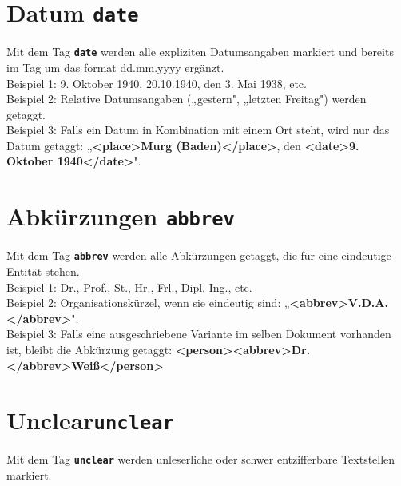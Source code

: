 \documentclass{article}
\begin{document}
\section*{Datum \texttt{\texttt{\textbf{{\colorbox{date}{date}}}}}}


Mit dem Tag \texttt{\texttt{\texttt{\textbf{{\colorbox{date}{date}}}}}} werden alle expliziten Datumsangaben markiert und bereits im Tag um das format dd.mm.yyyy ergänzt.\\

\noindent{} Beispiel 1: 9. Oktober 1940, 20.10.1940, den 3. Mai 1938, etc.\\
 Beispiel 2: Relative Datumsangaben („gestern", „letzten Freitag") werden getaggt.\\
 Beispiel 3: Falls ein Datum in Kombination mit einem Ort steht, wird nur das Datum getaggt: „\textbf{\textless place\textgreater Murg (Baden)\textless /place\textgreater }, den \textbf{\textless date\textgreater 9. Oktober 1940\textless /date\textgreater }". \\

\section*{Abkürzungen \texttt{\textbf{{\colorbox{abbrev}{abbrev}}}}}


Mit dem Tag \texttt{\texttt{\textbf{{\colorbox{abbrev}{abbrev}}}}} werden alle Abkürzungen getaggt, die für eine eindeutige Entität stehen. \\

\noindent{} Beispiel 1: Dr., Prof., St., Hr., Frl., Dipl.-Ing., etc.\\
 Beispiel 2: Organisationskürzel, wenn sie eindeutig sind: „\textbf{\textless abbrev\textgreater V.D.A.\textless /abbrev\textgreater }".\\
 Beispiel 3: Falls eine ausgeschriebene Variante im selben Dokument vorhanden ist, bleibt die Abkürzung getaggt: \textbf{\textless person\textgreater \textless abbrev\textgreater Dr.\textless /abbrev\textgreater Weiß\textless /person\textgreater}


\section*{Unclear\texttt{\textbf{{\colorbox{unclear}{unclear}}}}}


Mit dem Tag \texttt{\texttt{\textbf{{\colorbox{unclear}{unclear}}}}} werden unleserliche oder schwer entzifferbare Textstellen markiert. \\
\end{document}
